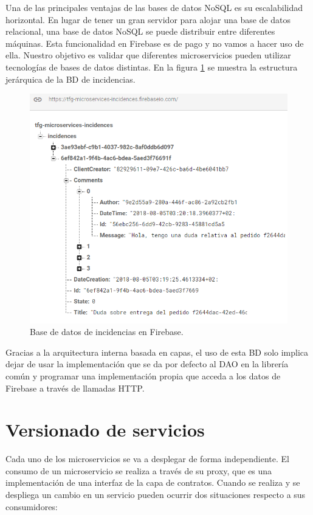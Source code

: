 \documentclass[11pt,spanish,listoffigures]{tfgetsinf}
\begin{document}
Una de las principales ventajas de las bases de datos NoSQL es su escalabilidad horizontal. En lugar de tener un gran servidor para alojar una base de datos relacional, una base de datos NoSQL se puede distribuir entre diferentes máquinas. Esta funcionalidad en Firebase es de pago y no vamos a hacer uso de ella. Nuestro objetivo  es validar que diferentes microservicios pueden utilizar tecnologías de bases de datos distintas. En la figura \ref{fig:Firebase} se muestra la estructura jerárquica de la BD de incidencias.

\begin{figure}[h]
\centering
\includegraphics[scale=0.85]{Firebase}
\caption{Base de datos de incidencias en Firebase.}
\label{fig:Firebase}
\end{figure}

Gracias a la arquitectura interna basada en capas, el uso de esta BD solo implica dejar de usar la implementación que se da por defecto al DAO en la librería común y programar una implementación propia que acceda a los datos de Firebase a través de llamadas HTTP.

\section{Versionado de servicios}

Cada uno de los microservicios se va a desplegar de forma independiente. El consumo de un microservicio se realiza a través de su proxy, que es una implementación de una interfaz de la capa de contratos. Cuando se realiza y se despliega un cambio en un servicio pueden ocurrir dos situaciones respecto a sus consumidores:
\end{document}
